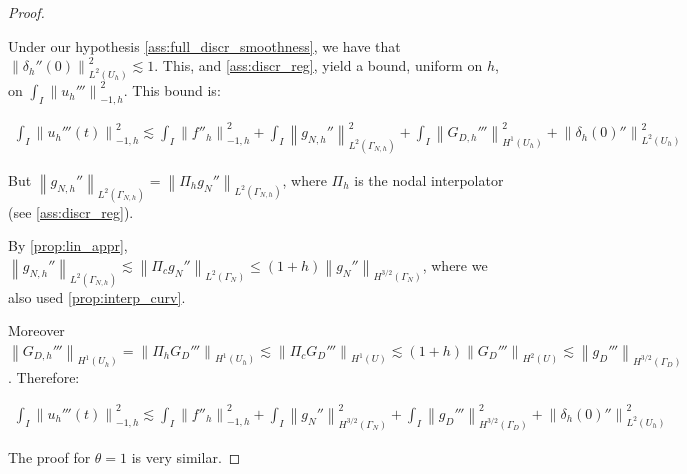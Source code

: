 \documentclass[english,a4paper,10pt,oneside]{scrbook}	%
\theoremstyle{break}
\newenvironment{mproof}[1][\proofname]{%
  \begin{proof}[#1]$ $\par\nobreak\ignorespaces
}{%
  \end{proof}
}
\renewcommand*{\proofname}{Proof}
\theoremstyle{remark}
\newcommand{\ds}{\displaystyle}
\newcommand{\norm}[1]{\left\lVert#1\right\rVert}
\begin{document}
\begin{appendices}
\begin{mproof}
Under our hypothesis \cref{ass:full_discr_smoothness}, we have that $\norm{\delta_h''(0)}_{L^2(U_h)}^2 \lesssim 1$. This, and \cref{ass:discr_reg}, yield a bound, uniform on $h$, on $\ds \int_I \norm{u_h'''}_{-1,h}^2$.
This bound is:

\begin{align*}
	\int_I \norm{u_h'''(t)}_{-1,h}^2\lesssim \int_I \norm{f''_h}_{-1,h}^2+\int_I\norm{g_{N,h}''}_{L^2(\Gamma_{N,h})}^2 + \int_I\norm{G_{D,h}'''}_{H^1(U_h)}^2 + \norm{\delta_{h}(0)''}_{L^2(U_h)}^2
\end{align*}

But $\norm{g_{N,h}''}_{L^2(\Gamma_{N,h})}=\norm{\Pi_h g_{N}''}_{L^2(\Gamma_{N,h})}$, where $\Pi_h$ is the nodal interpolator (see \cref{ass:discr_reg}). 

By \cref{prop:lin_appr}, $\norm{g_{N,h}''}_{L^2(\Gamma_{N,h})}\lesssim \norm{\Pi_c g_{N}''}_{L^2(\Gamma_{N})}\leq (1+h)\norm{ g_{N}''}_{H^{3/2}(\Gamma_{N})}$, where we also used \cref{prop:interp_curv}. 

Moreover $\norm{G_{D,h}'''}_{H^1(U_h)} = \norm{\Pi_h G_D'''}_{H^1(U_h)}\lesssim  \norm{\Pi_c G_D'''}_{H^1(U)}\lesssim (1+h)\norm{G_D'''}_{H^2(U)}\lesssim \norm{g_D'''}_{H^{3/2}(\Gamma_D)}$.
Therefore:

\begin{align*}
	\int_I \norm{u_h'''(t)}_{-1,h}^2\lesssim \int_I \norm{f''_h}_{-1,h}^2+\int_I\norm{ g_{N}''}_{H^{3/2}(\Gamma_{N})}^2 + \int_I\norm{g_D'''}_{H^{3/2}(\Gamma_D)}^2 + \norm{\delta_{h}(0)''}_{L^2(U_h)}^2
\end{align*}


The proof for $\theta=1$ is very similar.

%
%
%
%
%
%
%


\end{mproof}
\end{appendices}
\end{document}
